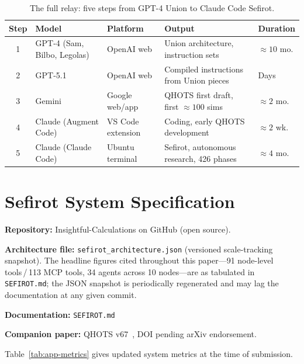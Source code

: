 \documentclass[11pt]{article}
\theoremstyle{definition}
\theoremstyle{remark}
\begin{document}
\begin{table}[ht]
\centering
\caption{The full relay: five steps from GPT-4 Union to Claude Code Sefirot.}
\label{tab:relay}
\begin{tabular}{@{}cllp{4cm}l@{}}
\toprule
\textbf{Step} & \textbf{Model} & \textbf{Platform} & \textbf{Output}
  & \textbf{Duration} \\
\midrule
1 & GPT-4 (Sam, Bilbo, Legolas) & OpenAI web
  & Union architecture, instruction sets & ${\approx}10$ mo. \\
2 & GPT-5.1 & OpenAI web
  & Compiled instructions from Union pieces & Days \\
3 & Gemini & Google web/app
  & QHOTS first draft, first ${\approx}100$ sims & ${\approx}2$ mo. \\
4 & Claude (Augment Code) & VS Code extension
  & Coding, early QHOTS development & ${\approx}2$ wk. \\
5 & Claude (Claude Code) & Ubuntu terminal
  & Sefirot, autonomous research, 426 phases & ${\approx}4$ mo. \\
\bottomrule
\end{tabular}
\end{table}

\section{Sefirot System Specification}
\label{app:sefirot-spec}

\noindent\textbf{Repository:} Insightful-Calculations on GitHub (open source).

\medskip
\noindent\textbf{Architecture file:} \texttt{sefirot\_architecture.json}
(versioned scale-tracking snapshot). The headline figures cited throughout
this paper---91 node-level tools\,/\,113 MCP tools, 34 agents across 10
nodes---are as tabulated in \texttt{SEFIROT.md}; the JSON snapshot is
periodically regenerated and may lag the documentation at any given commit.

\medskip
\noindent\textbf{Documentation:} \texttt{SEFIROT.md}

\medskip
\noindent\textbf{Companion paper:} QHOTS v67~\cite{qhots2026}, DOI pending
arXiv endorsement.

\medskip
\noindent Table~\ref{tab:app-metrics} gives updated system metrics at the time
of submission.
\end{document}
